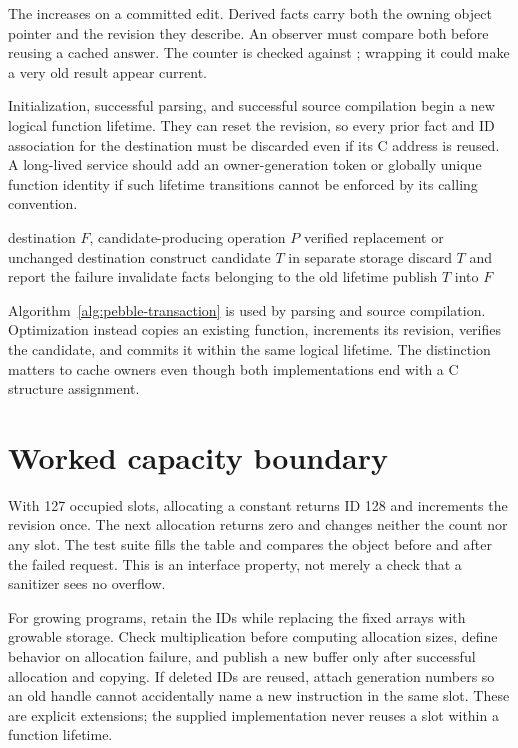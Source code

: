 The  increases on a committed edit.
Derived facts carry both the owning object pointer and the revision they describe.
An observer must compare both before reusing a cached answer.
The counter is checked against ; wrapping it could make a very old result appear current.

Initialization, successful parsing, and successful source compilation begin a new logical function lifetime.
They can reset the revision, so every prior fact and ID association for the destination must be discarded even if its C address is reused.
A long-lived service should add an owner-generation token or globally unique function identity if such lifetime transitions cannot be enforced by its calling convention.

\begin{algorithm}[htbp]
\caption{Replacing a complete function as a transaction.}
\label{alg:pebble-transaction}
\begin{pseudocode}
\Require destination $F$, candidate-producing operation $P$
\Ensure verified replacement or unchanged destination
\State construct candidate $T$ in separate storage
\State discard $T$ and report the failure
\Else
\State invalidate facts belonging to the old lifetime
\State publish $T$ into $F$
\EndIf
\end{pseudocode}
\end{algorithm}

Algorithm~\ref{alg:pebble-transaction} is used by parsing and source compilation.
Optimization instead copies an existing function, increments its revision, verifies the candidate, and commits it within the same logical lifetime.
The distinction matters to cache owners even though both implementations end with a C structure assignment.

\section{Worked capacity boundary}
\label{sec:pebble-full}
With 127 occupied slots, allocating a constant returns ID 128 and increments the revision once.
The next allocation returns zero and changes neither the count nor any slot.
The test suite fills the table and compares the object before and after the failed request.
This is an interface property, not merely a check that a sanitizer sees no overflow.

For growing programs, retain the IDs while replacing the fixed arrays with growable storage.
Check multiplication before computing allocation sizes, define behavior on allocation failure, and publish a new buffer only after successful allocation and copying.
If deleted IDs are reused, attach generation numbers so an old handle cannot accidentally name a new instruction in the same slot.
These are explicit extensions; the supplied implementation never reuses a slot within a function lifetime.

